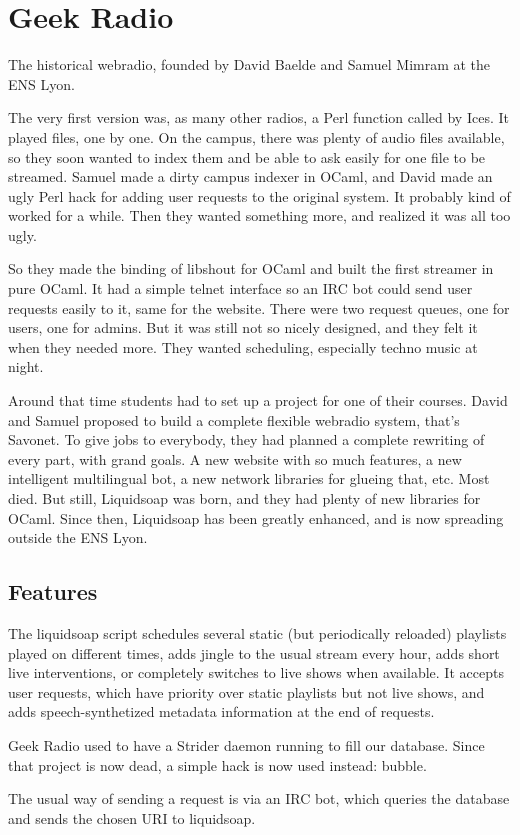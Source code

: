 \section{Geek Radio}
The historical webradio, founded by David Baelde and Samuel Mimram at the ENS Lyon.

The very first version was, as many other radios, a Perl function called by Ices. It played files, one by one. On the campus, there was plenty of audio files available, so they soon wanted to index them and be able to ask easily for one file to be streamed. Samuel made a dirty campus indexer in OCaml, and David made an ugly Perl hack for adding user requests to the original system. It probably kind of worked for a while. Then they wanted something more, and realized it was all too ugly.

So they made the binding of libshout for OCaml and built the first streamer in pure OCaml. It had a simple telnet interface so an IRC bot could send user requests easily to it, same for the website. There were two request queues, one for users, one for admins. But it was still not so nicely designed, and they felt it when they needed more. They wanted scheduling, especially techno music at night.

Around that time students had to set up a project for one of their courses. David and Samuel proposed to build a complete flexible webradio system, that's Savonet. To give jobs to everybody, they had planned a complete rewriting of every part, with grand goals. A new website with so much features, a new intelligent multilingual bot, a new network libraries for glueing that, etc. Most died. But still, Liquidsoap was born, and they had plenty of new libraries for OCaml. Since then, Liquidsoap has been greatly enhanced, and is now spreading outside the ENS Lyon.

\subsection{Features}
The liquidsoap script schedules several static (but periodically reloaded) playlists played on different times, adds jingle to the usual stream every hour, adds short live interventions, or completely switches to live shows when available. It accepts user requests, which have priority over static playlists but not live shows, and adds speech-synthetized metadata information at the end of requests.

Geek Radio used to have a Strider daemon running to fill our database. Since that project is now dead, a simple hack is now used instead: bubble.

The usual way of sending a request is via an IRC bot, which queries the database and sends the chosen URI to liquidsoap.

